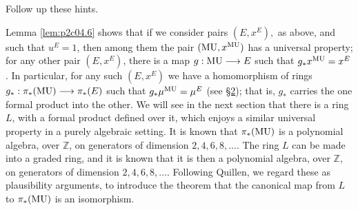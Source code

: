 \documentclass[../main]{subfiles}
\begin{document}
\begin{exercise}
Follow up these hints.
\end{exercise}

Lemma \ref{lem:p2c04.6} shows that if we consider pairs $(E,x^E),$ as above, and such that $u^E=1$, then among them the pair $(\mathrm{MU},x^{\mathrm{MU}})$ has a universal property; for any other pair $(E,x^E)$, there is a map $g:\mathrm{MU}\longrightarrow E$ such that $g_\ast x^{\mathrm{MU}}=x^E$. In particular, for any such $(E,x^E)$ we have a homomorphism of rings $g_\ast:\pi_\ast(\mathrm{MU})\longrightarrow \pi_\ast(E)$ such that $g_\ast\mu^{\mathrm{MU}}=\mu^E$ (see \hyperref[sec:p2c2]{\S 2}); that is, $g_\ast$ carries the one formal product into the other. We will see in the next section that there is a ring $L$, with a formal product defined over it, which enjoys a similar universal property in a purely algebraic setting. It is known that $\pi_\ast(\mathrm{MU})$ is a polynomial algebra, over $\mathbb{Z}$, on generators of dimension $2,4,6,8,...$. The ring $L$ can be made into a graded ring, and it is known that it is then a polynomial algebra, over $\mathbb{Z}$, on generators of dimension $2,4,6,8,...$. Following Quillen, we regard these as plausibility arguments, to introduce the theorem that the canonical map from $L$ to $\pi_\ast(\mathrm{MU})$ is an isomorphism.
\end{document}
